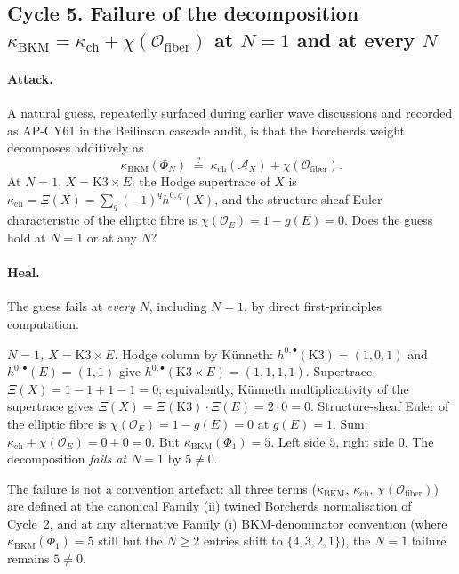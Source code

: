 \subsection*{Cycle 5. Failure of the decomposition
  $\kappa_{\mathrm{BKM}} = \kappa_{\mathrm{ch}} + \chi(\mathcal{O}_{\mathrm{fiber}})$
  at $N = 1$ and at every $N$}

\paragraph{Attack.} A natural guess, repeatedly surfaced during
earlier wave discussions and recorded as AP-CY61 in the
Beilinson cascade audit, is that the Borcherds weight
decomposes additively as
\[
  \kappa_{\mathrm{BKM}}(\Phi_N) \;\overset{?}{=}\;
    \kappa_{\mathrm{ch}}(\mathcal{A}_X) + \chi(\mathcal{O}_{\mathrm{fiber}}).
\]
At $N = 1$, $X = \mathrm{K3} \times E$: the Hodge supertrace of
$X$ is $\kappa_{\mathrm{ch}} = \Xi(X) = \sum_q (-1)^q h^{0, q}(X)$,
and the structure-sheaf Euler characteristic of the elliptic
fibre is $\chi(\mathcal{O}_E) = 1 - g(E) = 0$. Does the guess
hold at $N = 1$ or at any $N$?

\paragraph{Heal.} The guess fails at \emph{every} $N$, including
$N = 1$, by direct first-principles computation.

\emph{$N = 1$, $X = \mathrm{K3} \times E$.} Hodge column by
K\"unneth: $h^{0, \bullet}(\mathrm{K3}) = (1, 0, 1)$ and
$h^{0, \bullet}(E) = (1, 1)$ give
$h^{0, \bullet}(\mathrm{K3} \times E) = (1, 1, 1, 1)$. Supertrace
$\Xi(X) = 1 - 1 + 1 - 1 = 0$; equivalently, K\"unneth
multiplicativity of the supertrace gives
$\Xi(X) = \Xi(\mathrm{K3}) \cdot \Xi(E) = 2 \cdot 0 = 0$.
Structure-sheaf Euler of the elliptic fibre is
$\chi(\mathcal{O}_E) = 1 - g(E) = 0$ at $g(E) = 1$. Sum:
$\kappa_{\mathrm{ch}} + \chi(\mathcal{O}_E) = 0 + 0 = 0$. But
$\kappa_{\mathrm{BKM}}(\Phi_1) = 5$. Left side $5$, right side
$0$. The decomposition \emph{fails at $N = 1$} by $5 \neq 0$.

The failure is not a convention artefact: all three terms
($\kappa_{\mathrm{BKM}}$, $\kappa_{\mathrm{ch}}$,
$\chi(\mathcal{O}_{\mathrm{fiber}})$) are defined at the
canonical Family (ii) twined Borcherds normalisation of
Cycle~2, and at any alternative Family (i) BKM-denominator
convention (where $\kappa_{\mathrm{BKM}}(\Phi_1) = 5$ still but
the $N \geq 2$ entries shift to $\{4, 3, 2, 1\}$), the $N = 1$
failure remains $5 \neq 0$.

